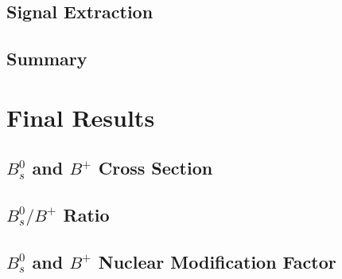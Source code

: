 \subsection{Signal Extraction}

\subsection{Summary}

\section{Final Results} 

\subsection{$B^0_s$ and $B^{+}$ Cross Section}

\subsection{$B^0_s/B^{+}$ Ratio}

\subsection{$B^0_s$ and $B^{+}$ Nuclear Modification Factor}

